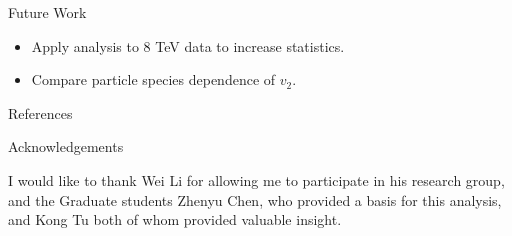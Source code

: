 \documentclass[final]{beamer}
\newlength{\onecolwid}
\begin{document}
\begin{frame}[t]
\begin{columns}[t]
\begin{column}{\onecolwid}
\begin{block}{Future Work}
\begin{itemize}
\item Apply analysis to 8 TeV data to increase statistics.
\item Compare particle species dependence of $ v_{2} $.
\end{itemize}
\end{block}
\vspace{-0.25in}



\begin{block}{References}

\nocite{*} %
\small{
\vspace{0.75in}}

\end{block}

\vspace{-1in}


\begin{block}{Acknowledgements}

I would like to thank Wei Li for allowing me to participate in his research
group, and the Graduate students Zhenyu Chen, who provided a basis for this
analysis, and Kong Tu both of whom provided valuable insight.

\end{block}



%
%


\end{column}
\end{columns}
\end{frame}
\end{document}
